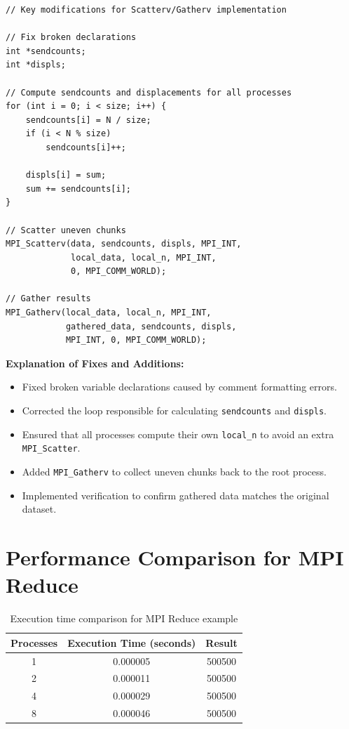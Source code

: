 \documentclass[12pt]{article}
\begin{document}
\begin{lstlisting}
// Key modifications for Scatterv/Gatherv implementation

// Fix broken declarations
int *sendcounts;
int *displs;

// Compute sendcounts and displacements for all processes
for (int i = 0; i < size; i++) {
    sendcounts[i] = N / size;
    if (i < N % size)
        sendcounts[i]++;

    displs[i] = sum;
    sum += sendcounts[i];
}

// Scatter uneven chunks
MPI_Scatterv(data, sendcounts, displs, MPI_INT,
             local_data, local_n, MPI_INT,
             0, MPI_COMM_WORLD);

// Gather results
MPI_Gatherv(local_data, local_n, MPI_INT,
            gathered_data, sendcounts, displs,
            MPI_INT, 0, MPI_COMM_WORLD);
\end{lstlisting}

\textbf{Explanation of Fixes and Additions:}

\begin{itemize}
\item Fixed broken variable declarations caused by comment formatting errors.
\item Corrected the loop responsible for calculating \texttt{sendcounts} and \texttt{displs}.
\item Ensured that all processes compute their own \texttt{local\_n} to avoid an extra \texttt{MPI\_Scatter}.
\item Added \texttt{MPI\_Gatherv} to collect uneven chunks back to the root process.
\item Implemented verification to confirm gathered data matches the original dataset.
\end{itemize}


\section{Performance Comparison for MPI Reduce}

\begin{table}[H]
\centering
\begin{tabular}{ccc}
\toprule
Processes & Execution Time (seconds) & Result \\
\midrule
1 & 0.000005 & 500500 \\
2 & 0.000011 & 500500 \\
4 & 0.000029 & 500500 \\
8 & 0.000046 & 500500 \\
\bottomrule
\end{tabular}
\caption{Execution time comparison for MPI Reduce example}
\end{table}
\end{document}
